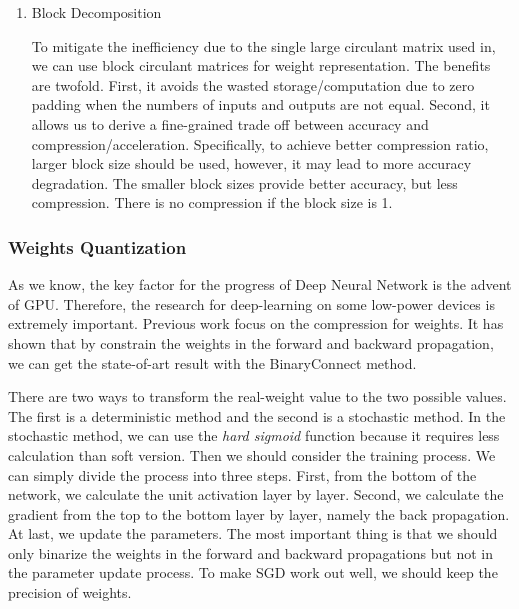 \documentclass[a4paper]{article}
\begin{document}
\begin{enumerate}
\item Block Decomposition\cite{block}
\par To mitigate the inefficiency due to the single large circulant matrix used in, we can use block circulant matrices for weight representation. The benefits are twofold. First, it avoids the wasted storage/computation due to zero padding when the numbers of inputs and outputs are not equal. Second, it allows us to derive a fine-grained trade off between accuracy and compression/acceleration. Specifically, to achieve better compression ratio, larger block size should be used, however, it may lead to more accuracy degradation. The smaller block sizes provide better accuracy, but less compression. There is no compression if the block size is 1.
\end{enumerate}


\subsubsection{Weights Quantization}

\par As we know, the key factor for the progress of Deep Neural Network is the advent of GPU. Therefore, the research for deep-learning on some low-power devices is extremely important. Previous work \cite{binary} focus on the compression for weights. It has shown that by constrain the weights in the forward and backward propagation, we can get the state-of-art result with the BinaryConnect method.
\par There are two ways to transform the real-weight value to the two possible values. The first is a deterministic method and the second is a stochastic method. In the stochastic method, we can use the \emph{hard sigmoid} function because it requires less calculation than soft version. Then we should consider the training process. We can simply divide the process into three steps. First, from the bottom of the network, we calculate the unit activation layer by layer. Second, we calculate the gradient from the top to the bottom layer by layer, namely the back propagation. At last, we update the parameters. The most important thing is that we should only binarize the weights in the forward and backward propagations but not in the parameter update process. To make SGD work out well, we should keep the precision of weights.
\end{document}
